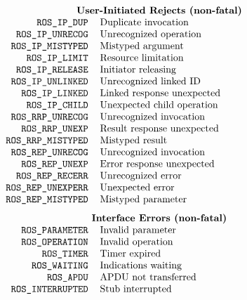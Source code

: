 
\normalsize
\[\begin{tabular}{rp{3.0in}}
    \multicolumn{2}{c}{\bf User-Initiated Rejects (non-fatal)}\\
\tt ROS\_IP\_DUP&	Duplicate invocation\\
\tt ROS\_IP\_UNRECOG&	Unrecognized operation\\
\tt ROS\_IP\_MISTYPED&	Mistyped argument\\
\tt ROS\_IP\_LIMIT&	Resource limitation\\
\tt ROS\_IP\_RELEASE&	Initiator releasing\\
\tt ROS\_IP\_UNLINKED&	Unrecognized linked ID\\
\tt ROS\_IP\_LINKED&	Linked response unexpected\\
\tt ROS\_IP\_CHILD&	Unexpected child operation\\
\tt ROS\_RRP\_UNRECOG&	Unrecognized invocation\\
\tt ROS\_RRP\_UNEXP&	Result response unexpected\\
\tt ROS\_RRP\_MISTYPED&	Mistyped result\\
\tt ROS\_REP\_UNRECOG&	Unrecognized invocation\\
\tt ROS\_REP\_UNEXP&	Error response unexpected\\
\tt ROS\_REP\_RECERR&	Unrecognized error\\
\tt ROS\_REP\_UNEXPERR&	Unexpected error\\
\tt ROS\_REP\_MISTYPED&	Mistyped parameter\\[0.1in]
    \multicolumn{2}{c}{\bf Interface Errors (non-fatal)}\\
\tt ROS\_PARAMETER&	Invalid parameter\\
\tt ROS\_OPERATION&	Invalid operation\\
\tt ROS\_TIMER&		Timer expired\\
\tt ROS\_WAITING&	Indications waiting\\
\tt ROS\_APDU&		APDU not transferred\\
\tt ROS\_INTERRUPTED&	Stub interrupted
\end{tabular}\]
